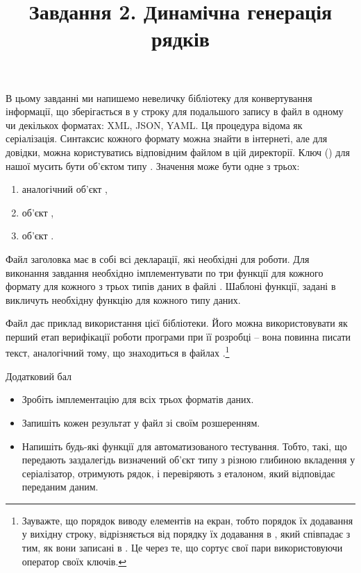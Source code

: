 \documentclass[12pt]{article}
\title{Завдання 2. Динамічна генерація рядків}
\begin{document}
\maketitle

В цьому завданні ми напишемо невеличку бібліотеку для конвертування інформації, що зберігається в  у строку для подальшого запису в файл в одному чи декількох форматах: XML, JSON, YAML. Ця процедура відома як серіалізація. Синтаксис кожного формату можна знайти в інтернеті, але для довідки, можна користуватись відповідним  файлом в цій директорії.
Ключ () для нашої  мусить бути об'єктом типу . Значення може бути одне з трьох:
\begin{enumerate}
  \item аналогічний об'єкт ,
  \item об'єкт ,
  \item об'єкт .
\end{enumerate}

Файл заголовка  має в собі всі декларації, які необхідні для роботи. Для виконання завдання необхідно імплементувати по три функції для кожного формату для кожного з трьох типів даних в файлі . Шаблоні функції, задані в  викличуть необхідну функцію для кожного типу даних.

Файл  дає приклад використання цієї бібліотеки. Його можна використовувати як перший етап верифікації роботи програми при її розробці -- вона повинна писати текст, аналогічний тому, що знаходиться в файлах .\footnote{Зауважте, що порядок виводу елементів на екран, тобто порядок їх додавання у вихідну строку, відрізняється від порядку їх додавання в , який співпадає з тим, як вони записані в . Це через те, що  сортує свої пари використовуючи оператор \m{<} своїх ключів.}

\begin{center}
    \large{Додатковий бал}
\end{center}

\begin{itemize}
\item Зробіть імплементацію для всіх трьох форматів даних.
\item Запишіть кожен результат у файл зі своїм розшеренням.
\item Напишіть будь-які функції для автоматизованого тестування. Тобто, такі, що передають заздалегідь визначений об'єкт типу  з різною глибиною вкладення у серіалізатор, отримують рядок, і перевіряють з еталоном, який відповідає переданим даним.
\end{itemize}
\end{document}
